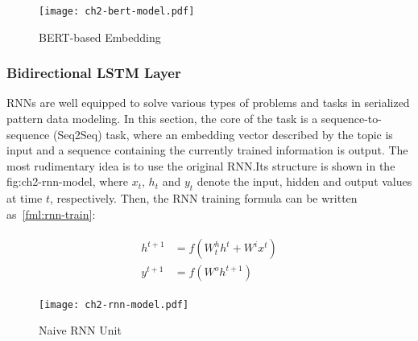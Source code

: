 \begin{figure}[htbp!]
	\centering
	\texttt{[image: ch2-bert-model.pdf]}
	\caption{BERT-based Embedding}\label{fig:ch2-bert-model}
\end{figure}

\subsubsection{Bidirectional LSTM Layer}

RNNs are well equipped to solve various types of problems and tasks in serialized pattern data modeling. In this section, the core of the task is a sequence-to-sequence (Seq2Seq) task, where an embedding vector described by the topic is input and a sequence containing the currently trained information is output. The most rudimentary idea is to use the original RNN.\@ Its structure is shown in the \figurename{fig:ch2-rnn-model}, where \(x_t\), \(h_t\) and \(y_t\) denote the input, hidden and output values at time \(t\), respectively. Then, the RNN training formula can be written as~\ref{fml:rnn-train}:

\begin{align}\label{fml:rnn-train}
	\begin{split}
		h^{t+1} & =f(W^h_{t} h^t+W^i x^t) \\
		y^{t+1} & =f(W^o h^{t+1})
	\end{split}
\end{align}


\begin{figure}[htbp!]
	\centering
	\texttt{[image: ch2-rnn-model.pdf]}
	\caption{Naive RNN Unit}\label{fig:ch2-rnn-model}
\end{figure}


